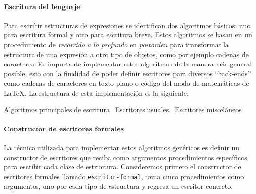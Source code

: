 \documentclass[10pt,oneside,openany,letterpaper]{book}
\begin{document}
\paragraph{Escritura del lenguaje} Para escribir estructuras de expresiones se identifican dos algoritmos básicos: uno para escritura formal y otro para escritura breve. Estos algoritmos se basan en un procedimiento de \emph{recorrido a lo profundo} en \emph{postorden} para transformar la estructura de una expresión a otro tipo de objetos, como por ejemplo cadenas de caracteres. Es importante implementar estos algoritmos de la manera más general posible, esto con la finalidad de poder definir escritores para diversos ``back-ends'' como cadenas de caracteres en texto plano o código del modo de matemáticas de \LaTeX{}. La estructura de esta implementación es la siguiente:

\nwenddocs{}\endmoddef
\LA{}Algoritmos principales de escritura~{\nwtagstyle{}}\RA{}
\LA{}Escritores usuales~{\nwtagstyle{}}\RA{}
\LA{}Escritores misceláneos~{\nwtagstyle{}}\RA{}
\nwendcode{}\nwdocspar


\paragraph{Constructor de escritores formales} La técnica utilizada para implementar estos algoritmos genéricos es definir un constructor de escritores que reciba como argumentos procedimientos específicos para escribir cada clase de estructura. Consideremos primero el constructor de escritores formales llamado {\tt{}\protect{}\protect{}escritor-formal}, toma cinco procedimientos como argumentos, uno por cada tipo de estructura y regresa un escritor concreto.
\end{document}

